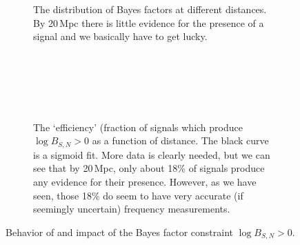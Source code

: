 \documentclass[showpacs, superscriptaddress, showpacs, letterpaper, showkeys,
preprintnumbers, altaffilletter, amssymb, amsmath, amsfonts, prd,
onecolumn, floatfix, nofootinbib]{revtex4-1}
\begin{document}
\begin{figure}
\begin{subfigure}{0.45\textwidth}
{}
\caption{The distribution of Bayes factors at different distances.  By 20\,Mpc
there is little evidence for the presence of a signal and we basically have to
get lucky.~\\~\\~\\~\\~\\~\\}
\end{subfigure}
\begin{subfigure}{0.45\textwidth}
{}
\caption{The `efficiency' (fraction of signals which produce $\log B_{S,N}>0$ as
a function of distance.  The black curve is a sigmoid fit.  More data is clearly
needed, but we can see that by 20\,Mpc, only about 18\% of signals produce
any evidence for their presence.  However, as we have seen, those 18\% do seem
to have very accurate (if seemingly uncertain) frequency measurements.}
\end{subfigure}
\caption{Behavior of and impact of the Bayes factor constraint $\log B_{S,N}>0$.}
\end{figure}
\end{document}
